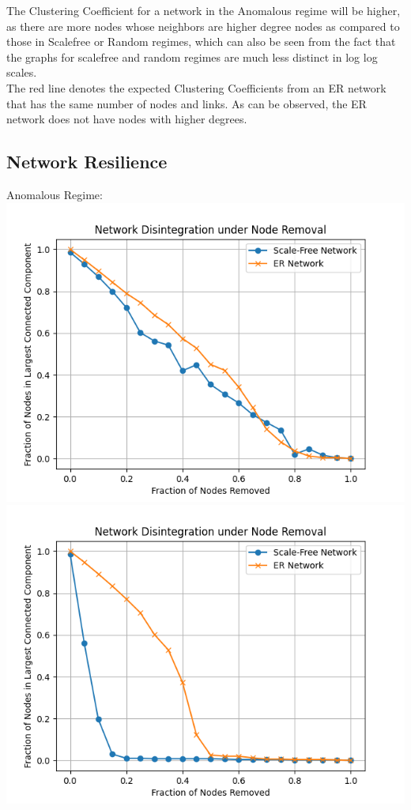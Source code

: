 \documentclass[11pt]{article}
\begin{document}
The Clustering Coefficient for a network in the Anomalous regime will be higher, as there are more nodes whose neighbors are higher degree nodes as compared to those in Scalefree or Random regimes, which can also be seen from the fact that the graphs for scalefree and random regimes are much less distinct in log log scales.\\
The red line denotes the expected Clustering Coefficients from an ER network that has the same number of nodes and links. As can be observed, the ER network does not have nodes with higher degrees.

\subsection{Network Resilience}
Anomalous Regime:\\
\includegraphics[scale=0.5]{rnranam.png} \includegraphics[scale=0.5]{tnranam.png}\\
\end{document}
